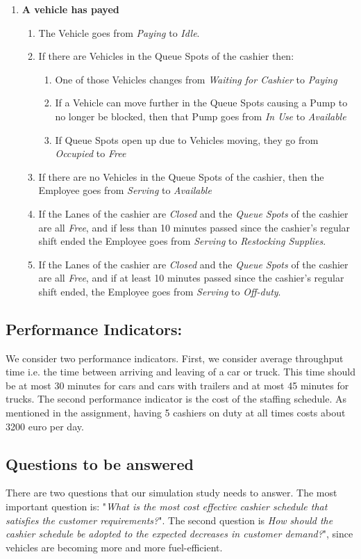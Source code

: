 \begin{enumerate}
	\item \textbf{A vehicle has payed}
	\begin{enumerate}
		\item The Vehicle goes from \textit{Paying} to \textit{Idle}.
		\item If there are Vehicles in the Queue Spots of the cashier then:
		\begin{enumerate}
			\item One of those Vehicles changes from \textit{Waiting for Cashier} to \textit{Paying}
			\item If a Vehicle can move further in the Queue Spots causing a Pump to no longer be blocked, then that Pump goes from \textit{In Use} to \textit{Available}
			\item If Queue Spots open up due to Vehicles moving, they go from \textit{Occupied} to \textit{Free}
		\end{enumerate}
		\item If there are no Vehicles in the Queue Spots of the cashier, then the Employee goes from \textit{Serving} to \textit{Available}
		\item If the Lanes of the cashier are \textit{Closed} and the \textit{Queue Spots} of the cashier are all \textit{Free}, and if less than 10 minutes passed since the cashier's regular shift ended the Employee goes from \textit{Serving} to \textit{Restocking Supplies}. 
		\item If the Lanes of the cashier are \textit{Closed} and the \textit{Queue Spots} of the cashier are all \textit{Free}, and if at least 10 minutes passed since the cashier's regular shift ended, the Employee goes from \textit{Serving} to \textit{Off-duty}. 
	\end{enumerate}
\end{enumerate}

\subsection{Performance Indicators:}
We consider two performance indicators.
First, we consider average throughput time i.e. the time between arriving and leaving of a car or truck.
This time should be at most 30 minutes for cars and cars with trailers and at most 45 minutes for trucks.
The second performance indicator is the cost of the staffing schedule.
As mentioned in the assignment, having 5 cashiers on duty at all times costs about 3200 euro per day.


\subsection{Questions to be answered}
There are two questions that our simulation study needs to answer. 
The most important question is: "\textit{What is the most cost effective cashier schedule that satisfies the customer requirements?}". 
The second question is \textit{How should the cashier schedule be adopted to the expected decreases in customer demand?}", since vehicles are becoming more and more fuel-efficient.

